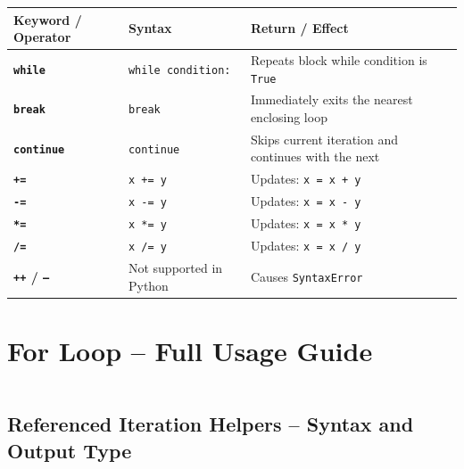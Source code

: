 \documentclass[a4paper,11pt]{article}
\begin{document}
	\begin{tabular}{>{\bfseries}p{4cm} p{7.5cm} p{3cm}}
		\toprule
		Keyword / Operator & Syntax & Return / Effect \\
		\midrule
		
		\texttt{while} & \texttt{while condition:} & Repeats block while condition is \texttt{True} \\
		
		\texttt{break} & \texttt{break} & Immediately exits the nearest enclosing loop \\
		
		\texttt{continue} & \texttt{continue} & Skips current iteration and continues with the next \\
		
		\texttt{+=} & \texttt{x += y} & Updates: \texttt{x = x + y} \\
		
		\texttt{-=} & \texttt{x -= y} & Updates: \texttt{x = x - y} \\
		
		\texttt{*=} & \texttt{x *= y} & Updates: \texttt{x = x * y} \\
		
		\texttt{/=} & \texttt{x /= y} & Updates: \texttt{x = x / y} \\
		
		\texttt{++} / \texttt{--} & Not supported in Python & Causes \texttt{SyntaxError} \\
		
		\bottomrule
	\end{tabular}
	
		\newpage

	\section{For Loop – Full Usage Guide}
	\inputminted{python}{Python_Files/for_loop_guid.py}
	
	\vspace{1em}
	\subsection*{Referenced Iteration Helpers – Syntax and Output Type}
	
\end{document}
